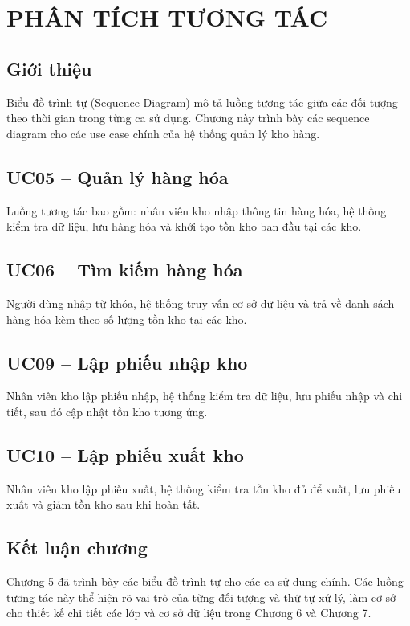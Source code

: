 \chapter{PHÂN TÍCH TƯƠNG TÁC}

\section{Giới thiệu}

Biểu đồ trình tự (Sequence Diagram) mô tả luồng tương tác giữa các đối tượng theo thời gian trong từng ca sử dụng. Chương này trình bày các sequence diagram cho các use case chính của hệ thống quản lý kho hàng.

\section{UC05 -- Quản lý hàng hóa}

Luồng tương tác bao gồm: nhân viên kho nhập thông tin hàng hóa, hệ thống kiểm tra dữ liệu, lưu hàng hóa và khởi tạo tồn kho ban đầu tại các kho.



\section{UC06 -- Tìm kiếm hàng hóa}

Người dùng nhập từ khóa, hệ thống truy vấn cơ sở dữ liệu và trả về danh sách hàng hóa kèm theo số lượng tồn kho tại các kho.



\section{UC09 -- Lập phiếu nhập kho}

Nhân viên kho lập phiếu nhập, hệ thống kiểm tra dữ liệu, lưu phiếu nhập và chi tiết, sau đó cập nhật tồn kho tương ứng.



\section{UC10 -- Lập phiếu xuất kho}

Nhân viên kho lập phiếu xuất, hệ thống kiểm tra tồn kho đủ để xuất, lưu phiếu xuất và giảm tồn kho sau khi hoàn tất.



\section{Kết luận chương}

Chương 5 đã trình bày các biểu đồ trình tự cho các ca sử dụng chính. Các luồng tương tác này thể hiện rõ vai trò của từng đối tượng và thứ tự xử lý, làm cơ sở cho thiết kế chi tiết các lớp và cơ sở dữ liệu trong Chương 6 và Chương 7.
